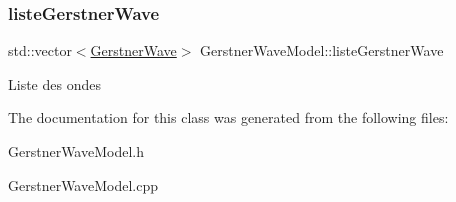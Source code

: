 \subsubsection{\texorpdfstring{liste\+Gerstner\+Wave}{listeGerstnerWave}}
{\footnotesize\ttfamily std\+::vector$<$\hyperlink{class_gerstner_wave}{Gerstner\+Wave}$>$ Gerstner\+Wave\+Model\+::liste\+Gerstner\+Wave}

Liste des ondes 

The documentation for this class was generated from the following files\+:\begin{DoxyCompactItemize}
\item 
Gerstner\+Wave\+Model.\+h\item 
Gerstner\+Wave\+Model.\+cpp\end{DoxyCompactItemize}
